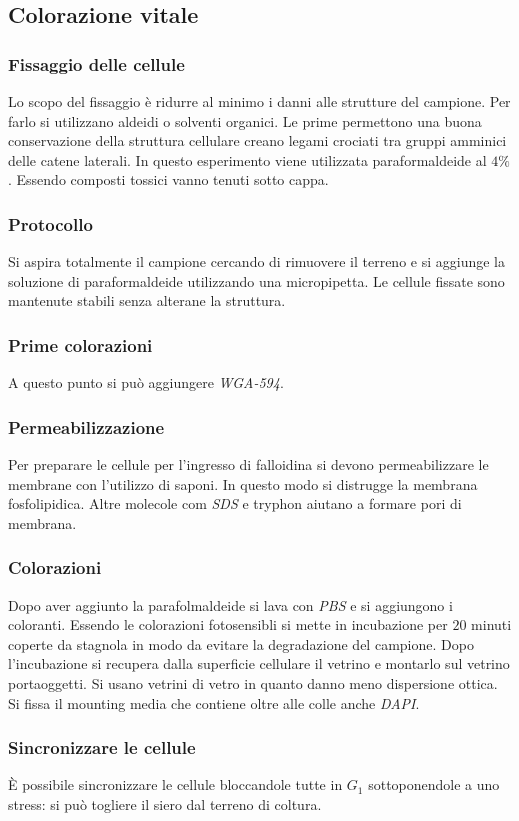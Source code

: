 	\subsection{Colorazione vitale}
		
		\subsubsection{Fissaggio delle cellule}
		Lo scopo del fissaggio \`e ridurre al minimo i danni alle strutture del campione.
		Per farlo si utilizzano aldeidi o solventi organici.
		Le prime permettono una buona conservazione della struttura cellulare creano legami crociati tra gruppi amminici delle catene laterali.
		In questo esperimento viene utilizzata paraformaldeide al $4\%$.
		Essendo composti tossici vanno tenuti sotto cappa.

		\subsubsection{Protocollo}
		Si aspira totalmente il campione cercando di rimuovere il terreno e si aggiunge la soluzione di paraformaldeide utilizzando una micropipetta.
		Le cellule fissate sono mantenute stabili senza alterane la struttura. 

		\subsubsection{Prime colorazioni}
		A questo punto si pu\`o aggiungere \emph{WGA-594}.

		\subsubsection{Permeabilizzazione}
		Per preparare le cellule per l'ingresso di falloidina si devono permeabilizzare le membrane con l'utilizzo di saponi.
		In questo modo si distrugge la membrana fosfolipidica.
		Altre molecole com \emph{SDS} e tryphon aiutano a formare pori di membrana.

		\subsubsection{Colorazioni}
		Dopo aver aggiunto la parafolmaldeide si lava con \emph{PBS} e si aggiungono i coloranti.
		Essendo le colorazioni fotosensibli si mette in incubazione per $20$ minuti coperte da stagnola in modo da evitare la degradazione del campione.
		Dopo l'incubazione si recupera dalla superficie cellulare il vetrino e montarlo sul vetrino portaoggetti.
		Si usano vetrini di vetro in quanto danno meno dispersione ottica.
		Si fissa il mounting media che contiene oltre alle colle anche \emph{DAPI}.

		\subsubsection{Sincronizzare le cellule}
		\`E possibile sincronizzare le cellule bloccandole tutte in $G_1$ sottoponendole a uno stress: si pu\`o togliere il siero dal terreno di coltura.
